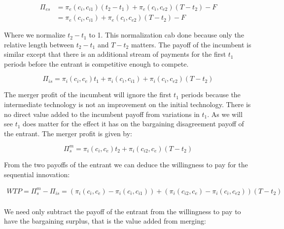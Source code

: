 \begin{align*}
\Pi_{es} &= \pi_e(c_i,c_{i1}) (t_2-t_1) +\pi_e(c_i,c_{e2})(T-t_2)-F \\
&= \pi_e(c_i,c_{i1}) +\pi_e(c_i,c_{e2})(T-t_2)-F
\end{align*}

Where we normalize $t_2-t_1$ to 1. This normalization cab done because only the relative length between $t_2-t_1$ and $T-t_2$ matters. The payoff of the incumbent is similar except that there is an additional stream of payments for the first $t_1$ periods before the entrant is competitive enough to compete. 

\begin{equation*}
\Pi_{is} = \pi_i(c_i,c_{e})t_1+\pi_i(c_i,c_{i1}) +\pi_i(c_i,c_{e2})(T-t_2)
\end{equation*}

The merger profit of the incumbent will ignore the first $t_1$ periods because the intermediate technology is not an improvement on the initial technology. There is no direct value added to the incumbent payoff from variations in $t_1$. As we will see $t_1$ does matter for the effect it has on the bargaining disagreement payoff of the entrant. The merger profit is given by: 

\begin{equation*}
\Pi_{s}^m= \pi_i(c_i,c_{e}) t_2+\pi_i(c_{i2},c_e)(T-t_2)
\end{equation*}

From the two payoffs of the entrant we can deduce the willingness to pay for the sequential innovation: 


\begin{align*}
WTP=\Pi_{s}^m-\Pi_{is} = (\pi_i(c_i,c_{e})-\pi_i(c_i,c_{i1}))+(\pi_i(c_{i2},c_e)-\pi_i(c_{i},c_{e2}))(T-t_2) \\
\end{align*}

We need only subtract the payoff of the entrant from the willingness to pay to have the bargaining surplus, that is the value added from merging:

